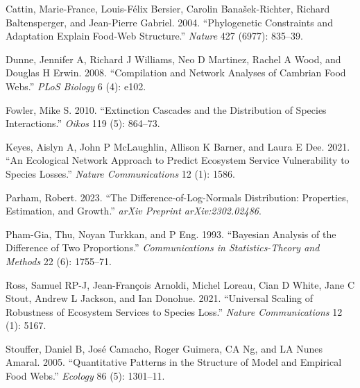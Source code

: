 \documentclass[
  letterpaper,
  DIV=11,
  numbers=noendperiod]{scrartcl}
\newlength{\cslhangindent}
\newenvironment{CSLReferences}[2] %
 {\begin{list}{}{%
  \setlength{\itemindent}{0pt}
  \setlength{\leftmargin}{0pt}
  \setlength{\parsep}{0pt}
  \ifodd #1
   \setlength{\leftmargin}{\cslhangindent}
   \setlength{\itemindent}{-1\cslhangindent}
  \fi
  \setlength{\itemsep}{#2\baselineskip}}}
 {\end{list}}
\begin{document}
\label{refs}
\begin{CSLReferences}{1}{0}
Cattin, Marie-France, Louis-Félix Bersier, Carolin Banašek-Richter,
Richard Baltensperger, and Jean-Pierre Gabriel. 2004. {``Phylogenetic
Constraints and Adaptation Explain Food-Web Structure.''} \emph{Nature}
427 (6977): 835--39.

Dunne, Jennifer A, Richard J Williams, Neo D Martinez, Rachel A Wood,
and Douglas H Erwin. 2008. {``Compilation and Network Analyses of
Cambrian Food Webs.''} \emph{PLoS Biology} 6 (4): e102.

Fowler, Mike S. 2010. {``Extinction Cascades and the Distribution of
Species Interactions.''} \emph{Oikos} 119 (5): 864--73.

Keyes, Aislyn A, John P McLaughlin, Allison K Barner, and Laura E Dee.
2021. {``An Ecological Network Approach to Predict Ecosystem Service
Vulnerability to Species Losses.''} \emph{Nature Communications} 12 (1):
1586.

Parham, Robert. 2023. {``The Difference-of-Log-Normals Distribution:
Properties, Estimation, and Growth.''} \emph{arXiv Preprint
arXiv:2302.02486}.

Pham-Gia, Thu, Noyan Turkkan, and P Eng. 1993. {``Bayesian Analysis of
the Difference of Two Proportions.''} \emph{Communications in
Statistics-Theory and Methods} 22 (6): 1755--71.

Ross, Samuel RP-J, Jean-François Arnoldi, Michel Loreau, Cian D White,
Jane C Stout, Andrew L Jackson, and Ian Donohue. 2021. {``Universal
Scaling of Robustness of Ecosystem Services to Species Loss.''}
\emph{Nature Communications} 12 (1): 5167.

Stouffer, Daniel B, José Camacho, Roger Guimera, CA Ng, and LA Nunes
Amaral. 2005. {``Quantitative Patterns in the Structure of Model and
Empirical Food Webs.''} \emph{Ecology} 86 (5): 1301--11.

\end{CSLReferences}
\end{document}
